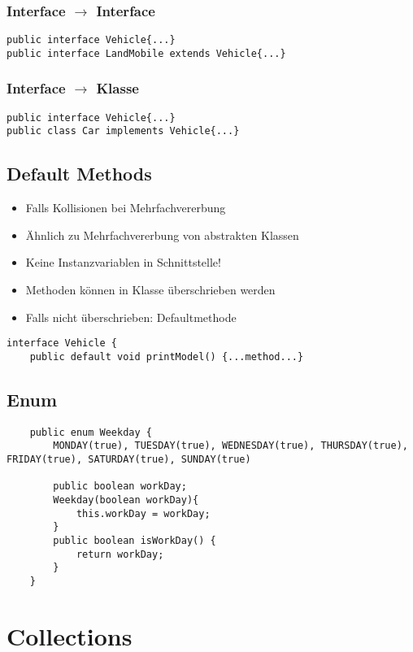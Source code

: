 \begin{multicols*}{5}
		\subsubsection{Interface $\rightarrow$ Interface}
			\begin{lstlisting}
public interface Vehicle{...}
public interface LandMobile extends Vehicle{...}
			\end{lstlisting}
		\subsubsection{Interface $\rightarrow$ Klasse}
			\begin{lstlisting}
public interface Vehicle{...}
public class Car implements Vehicle{...}
			\end{lstlisting}
	
	\subsection{Default Methods}
	\begin{itemize}
		\item Falls Kollisionen bei Mehrfachvererbung 
		\item Ähnlich zu Mehrfachvererbung von abstrakten Klassen
		\item Keine Instanzvariablen in Schnittstelle!
		\item Methoden können in Klasse überschrieben werden
		\item Falls nicht überschrieben: Defaultmethode
	\end{itemize}
		\begin{lstlisting}
interface Vehicle {
	public default void printModel() {...method...}
		\end{lstlisting}


	\subsection{Enum}
\begin{lstlisting}
	public enum Weekday {
		MONDAY(true), TUESDAY(true), WEDNESDAY(true), THURSDAY(true), FRIDAY(true), SATURDAY(true), SUNDAY(true)
		
		public boolean workDay;		
		Weekday(boolean workDay){
			this.workDay = workDay;
		}
		public boolean isWorkDay() {
			return workDay;
		}
	}
\end{lstlisting}


	\section{Collections}

\end{multicols*}
